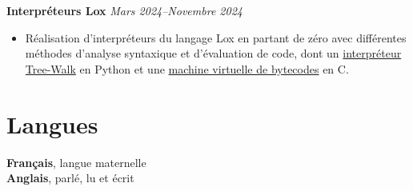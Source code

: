 \documentclass[margin,line]{../res}
\begin{document}
\begin{resume}
  {\bf Interpréteurs Lox}
  \hfill {\it Mars 2024--Novembre 2024}
  \vspace*{.05in}
  \begin{itemize}
    \item Réalisation d'interpréteurs du langage Lox en partant de
      zéro avec différentes méthodes d'analyse syntaxique et
      d'évaluation de code, dont un
      \href{https://github.com/theobori/tinylox}{interpréteur
      Tree-Walk} en Python et une
      \href{https://github.com/theobori/lox-virtual-machine}{machine
      virtuelle de bytecodes} en C.
  \end{itemize}

  \section{\sc Langues}
  \begingroup
  \raggedright
  {\bf Français}, langue maternelle\\
  \vspace*{.15in}
  {\bf Anglais}, parlé, lu et écrit
  \endgroup

\end{resume}
\end{document}
